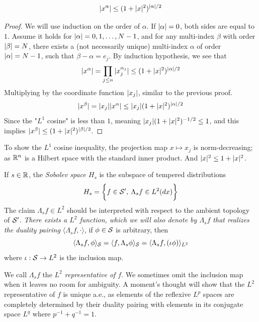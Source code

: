 \documentclass[../main-v2-manifolds.tex]{subfiles}
\begin{document}
\begin{note}
\begin{lemma}
\begin{equation}
\vert {x^{\alpha}} \vert \leq (1+\vert {x} \vert^2)^{\vert {\alpha} \vert/2}
\label{eq:multi-index power bounded by sobolev factor}
\end{equation}
\end{lemma}
\begin{proof}
We will use induction on the order of $\alpha$. If $\vert {\alpha} \vert=0$, both sides are equal to $1$. Assume it holds for $\vert {\alpha} \vert = 0,1,\ldots, N-1$, and for any multi-index $\beta$ with order $\vert {\beta} \vert = N$, there exists a (not necessarily unique) multi-index $\alpha$ of order $\vert {\alpha} \vert = N-1$, such that $\beta-\alpha = e_j$. By induction hypothesis, we see that 
\[
\vert {x^{\alpha}} \vert = \prod_{j\leq n} \vert {x^{\alpha_j}_{j}} \vert\leq (1+\vert {x} \vert^2)^{\vert {\alpha} \vert/2}
\]
Multiplying by the coordinate function $\vert {x_j} \vert$, similar to the previous proof. 
\[
\vert {x^{\beta}} \vert = \vert {x_j} \vert \vert {x^{\alpha}} \vert\leq \vert {x_j} \vert  (1+\vert {x} \vert^2)^{\vert {\alpha} \vert/2}
\]
Since the "$L^1$ cosine" is less than $1$, meaning $\vert {x_j} \vert(1+\vert {x} \vert^2)^{-1/2}\leq 1$, and this implies $\vert {x^{\beta}} \vert\leq (1+\vert {x} \vert^2)^{\vert {\beta} \vert/2}$.
\end{proof}
\begin{remark}
To show the $L^1$ cosine inequality, the projection map $x\mapsto x_j$ is norm-decreasing; as ${\mathbb{R}^n}$ is a Hilbert space with the standard inner product. And $\vert {x} \vert^2\leq 1 + \vert {x} \vert ^2$.
\end{remark}
\end{note}

\begin{definition}
If $s\in\mathbb{R}$, the \emph{Sobolev space $H_s$} is the subspace of tempered distributions
\[
H_s = \biggl\{{f\in \mathcal{S}',\: \Lambda_sf\in L^2(dx)}\biggr\}
\]
The claim $\Lambda_sf\in L^2$ should be interpreted with respect to the ambient topology of $\mathcal{S}'$. \emph{There exists a $L^2$ function, which we will also denote by $\Lambda_sf$ that realizes the duality pairing $\langle \Lambda_s f, \cdot\rangle$}, if $\phi\in\mathcal{S}$ is arbitrary, then
\[
\langle \Lambda_s f,\phi\rangle_{\mathcal{S}} = \langle f, \Lambda_s \phi\rangle_{\mathcal{S}} = \langle \Lambda_s f,  (\iota\phi)\rangle_{L^2} 
\]
where $\iota: \mathcal{S}\to L^2$ is the inclusion map.
\end{definition}

We call $\Lambda_s f$ the \emph{$L^2$ representative of $f$}. We sometimes omit the inclusion map when it leaves no room for ambiguity. A moment's thought will show that the $L^2$ representative of $f$ is unique a.e., as elements of the reflexive $L^p$ spaces are completely determined by their duality pairing with elements in its conjugate space $L^q$ where $p^{-1}+q^{-1}=1$.\\
\end{document}
